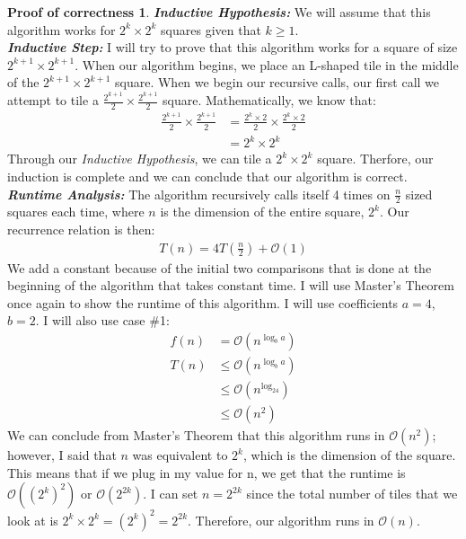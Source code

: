 \documentclass[11pt]{article}
\theoremstyle{definition}
\newtheorem*{proofoc}{Proof of correctness}
\begin{document}
\begin{enumerate}
\begin{proofoc}
    \textbf{\textit{Inductive Hypothesis: }}We will assume that this algorithm works for $2^k \times 2^k$ squares given that $k \geq 1$. \\[0.7em]
    \textbf{\textit{Inductive Step: }}I will try to prove that this algorithm works for a square of size $2^{k+1} \times 2^{k+1}$. When our algorithm begins, we place an L-shaped tile 
    in the middle of the $2^{k+1} \times 2^{k+1}$ square. When we begin our recursive calls, our first call we attempt to tile a $\frac{2^{k+1}}{2} \times \frac{2^{k+1}}{2}$ square.
    Mathematically, we know that:
    \begin{align*}
        \frac{2^{k+1}}{2} \times \frac{2^{k+1}}{2} & = \frac{2^k\times 2}{2} \times \frac{2^k\times 2}{2} \\
        & = 2^k \times 2^k
    \end{align*}
    Through our \textit{Inductive Hypothesis}, we can tile a $2^k \times 2^k$ square. Therfore, our induction is complete and we can conclude that our algorithm is correct. \\[1em]
    \textbf{\textit{Runtime Analysis: }}The algorithm recursively calls itself 4 times on $\frac{n}{2}$ sized squares each time, where $n$ is the dimension of the entire square, $2^k$. Our recurrence relation is then: 
    \begin{align*}
        T(n) = 4T(\frac{n}{2}) + \mathcal{O}(1)
    \end{align*}
    We add a constant because of the initial two comparisons that is done at the beginning of the algorithm that takes constant time. I will use Master's Theorem once again to show the runtime of 
    this algorithm. I will use coefficients $a=4$, $b=2$. I will also use case \#1:  
    \begin{align*}
        f(n) &= \mathcal{O}(n^{\log_ba}) \\
        T(n) & \leq \mathcal{O}(n^{\log_ba}) \\
        & \leq \mathcal{O}(n^{\log_24}) \\
        & \leq \mathcal{O}(n^2)
    \end{align*}
    We can conclude from Master's Theorem that this algorithm runs in $\mathcal{O}(n^2)$; however, I said that $n$ was equivalent to $2^k$, which is the dimension of the square. 
    This means that if we plug in my value for n, we get that the runtime is $\mathcal{O}((2^k)^2)$ or $\mathcal{O}(2^{2k})$. I can set $n = 2^{2k}$ since the total number of 
    tiles that we look at is $2^k \times 2^k = (2^k)^2 = 2^{2k}$. Therefore, our algorithm runs in $\mathcal{O}(n)$. 
\end{proofoc}
\newpage
\end{enumerate}
\end{document}
